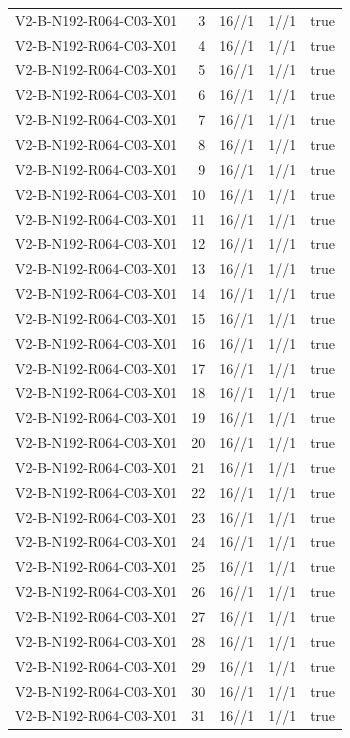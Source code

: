 {\begin{longtable}{lrrrr}
V2-B-N192-R064-C03-X01 & 3 & 16//1 & 1//1 & true \\
V2-B-N192-R064-C03-X01 & 4 & 16//1 & 1//1 & true \\
V2-B-N192-R064-C03-X01 & 5 & 16//1 & 1//1 & true \\
V2-B-N192-R064-C03-X01 & 6 & 16//1 & 1//1 & true \\
V2-B-N192-R064-C03-X01 & 7 & 16//1 & 1//1 & true \\
V2-B-N192-R064-C03-X01 & 8 & 16//1 & 1//1 & true \\
V2-B-N192-R064-C03-X01 & 9 & 16//1 & 1//1 & true \\
V2-B-N192-R064-C03-X01 & 10 & 16//1 & 1//1 & true \\
V2-B-N192-R064-C03-X01 & 11 & 16//1 & 1//1 & true \\
V2-B-N192-R064-C03-X01 & 12 & 16//1 & 1//1 & true \\
V2-B-N192-R064-C03-X01 & 13 & 16//1 & 1//1 & true \\
V2-B-N192-R064-C03-X01 & 14 & 16//1 & 1//1 & true \\
V2-B-N192-R064-C03-X01 & 15 & 16//1 & 1//1 & true \\
V2-B-N192-R064-C03-X01 & 16 & 16//1 & 1//1 & true \\
V2-B-N192-R064-C03-X01 & 17 & 16//1 & 1//1 & true \\
V2-B-N192-R064-C03-X01 & 18 & 16//1 & 1//1 & true \\
V2-B-N192-R064-C03-X01 & 19 & 16//1 & 1//1 & true \\
V2-B-N192-R064-C03-X01 & 20 & 16//1 & 1//1 & true \\
V2-B-N192-R064-C03-X01 & 21 & 16//1 & 1//1 & true \\
V2-B-N192-R064-C03-X01 & 22 & 16//1 & 1//1 & true \\
V2-B-N192-R064-C03-X01 & 23 & 16//1 & 1//1 & true \\
V2-B-N192-R064-C03-X01 & 24 & 16//1 & 1//1 & true \\
V2-B-N192-R064-C03-X01 & 25 & 16//1 & 1//1 & true \\
V2-B-N192-R064-C03-X01 & 26 & 16//1 & 1//1 & true \\
V2-B-N192-R064-C03-X01 & 27 & 16//1 & 1//1 & true \\
V2-B-N192-R064-C03-X01 & 28 & 16//1 & 1//1 & true \\
V2-B-N192-R064-C03-X01 & 29 & 16//1 & 1//1 & true \\
V2-B-N192-R064-C03-X01 & 30 & 16//1 & 1//1 & true \\
V2-B-N192-R064-C03-X01 & 31 & 16//1 & 1//1 & true \\

\end{longtable}}
